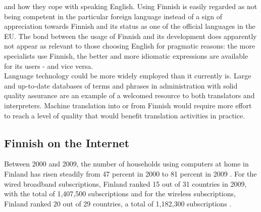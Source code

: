 \begin{multicols}{2}
and how they cope with speaking English. Using Finnish is easily
regarded as not being competent in the particular foreign language
instead of a sign of appreciation towards Finnish and its status as
one of the official languages in the EU. The bond between the usage of
Finnish and its development does apparently not appear as relevant to
those choosing English for pragmatic reasons: the more specialists use
Finnish, the better and more idiomatic expressions are available for
its users - and vice versa.\\
Language technology could be more widely employed than it currently
is. Large and up-to-date databases of terms and phrases in
administration with solid quality assurance are an example of a
welcomed resource to both translators and interpreters. Machine
translation into or from Finnish would require more effort to reach a
level of quality that would benefit translation activities in
practice.
\subsection{Finnish on the Internet}

Between 2000 and 2009, the number of households using computers at
home in Finland has risen steadily from 47 percent in 2000 to 81
percent in 2009 \cite{OECD-ICT}. For the wired broadband
subscriptions, Finland ranked 15 out of 31 countries in 2009, with the
total of 1,407,500 subscriptions \cite{OECD-wired} and for the
wireless subscriptions, Finland ranked 20 out of 29 countries, a total
of 1,182,300 subscriptions \cite{OECD-mobile}.


\end{multicols}
